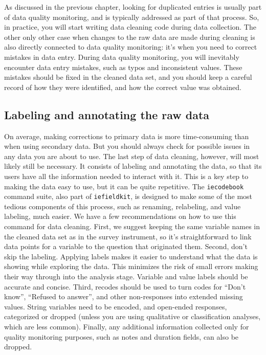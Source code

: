 As discussed in the previous chapter,
looking for duplicated entries is usually part of data quality monitoring,
and is typically addressed as part of that process.
So, in practice, you will start writing data cleaning code during data collection.
The other only other case when changes to the raw data are made during cleaning
is also directly connected to data quality monitoring:
it's when you need to correct mistakes in data entry.
During data quality monitoring, you will inevitably encounter data entry mistakes,
such as typos and inconsistent values.
These mistakes should be fixed in the cleaned data set,
and you should keep a careful record of how they were identified,
and how the correct value was obtained.

\subsection{Labeling and annotating the raw data}

On average, making corrections to primary data is more time-consuming than when using secondary data.
But you should always check for possible issues in any data you are about to use.
The last step of data cleaning, however, will most likely still be necessary.
It consists of labeling and annotating the data, so that its users have all the 
information needed to interact with it.
This is a key step to making the data easy to use, but it can be quite repetitive.
The \texttt{iecodebook} command suite, also part of \texttt{iefieldkit},
is designed to make some of the most tedious components of this process,
such as renaming, relabeling, and value labeling, much easier.
We have a few recommendations on how to use this command for data cleaning.
First, we suggest keeping the same variable names in the cleaned data set as in the survey instrument, so it's straightforward to link data points for a variable to the question that originated them.
Second, don't skip the labeling.
Applying labels makes it easier to understand what the data is showing while exploring the data. 
This minimizes the risk of small errors making their way through into the analysis stage.
Variable and value labels should be accurate and concise.
Third, recodes should be used to turn codes for ``Don't know'', ``Refused to answer'', and
other non-responses into extended missing values.
String variables need to be encoded, and open-ended responses, categorized or dropped
(unless you are using qualitative or classification analyses, which are less common).
Finally, any additional information collected only for quality monitoring purposes,
such as notes and duration fields, can also be dropped.

